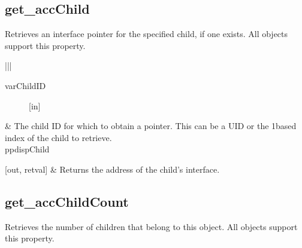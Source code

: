 \documentclass[letterpaper,12pt,english,openany,oneside]{sphinxmanual}
\begin{document}

\begin{sphinxVerbatim}[commandchars=\\\{\}]
\end{sphinxVerbatim}


\subsection{get\_accChild}
\label{\detokenize{MSAA_PDF:get-accchild}}
Retrieves an  interface pointer for the specified child, if one exists. All objects support this property.

\begin{sphinxVerbatim}[commandchars=\\\{\}]
    
\end{sphinxVerbatim}



\begin{savenotes}\sphinxattablestart
\centering
{}\label{\detokenize{MSAA_PDF:section-2}}\nobreak
\begin{tabular}[t]{|*{2}{|}}
\hline
\begin{description}
\item[{varChildID}] \leavevmode
{[}in{]}

\end{description}
&
The child ID for which to obtain a pointer. This can be a UID or the 1\sphinxhyphen{}based index of the child to retrieve.
\\
\hline
ppdispChild

{[}out, retval{]}
&
Returns the address of the child’s  interface.
\\
\hline
\end{tabular}
\par
\sphinxattableend\end{savenotes}


\begin{sphinxVerbatim}[commandchars=\\\{\}]
\end{sphinxVerbatim}


\subsection{get\_accChildCount}
\label{\detokenize{MSAA_PDF:get-accchildcount}}
Retrieves the number of children that belong to this object. All objects support this property.
\end{document}
